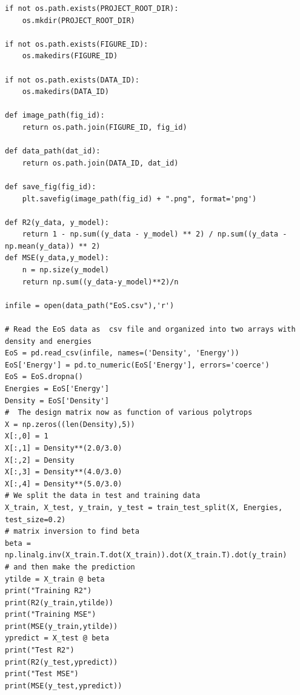 \documentclass{beamer}
\begin{document}
\begin{frame}
\begin{verbatim}
if not os.path.exists(PROJECT_ROOT_DIR):
    os.mkdir(PROJECT_ROOT_DIR)

if not os.path.exists(FIGURE_ID):
    os.makedirs(FIGURE_ID)

if not os.path.exists(DATA_ID):
    os.makedirs(DATA_ID)

def image_path(fig_id):
    return os.path.join(FIGURE_ID, fig_id)

def data_path(dat_id):
    return os.path.join(DATA_ID, dat_id)

def save_fig(fig_id):
    plt.savefig(image_path(fig_id) + ".png", format='png')

def R2(y_data, y_model):
    return 1 - np.sum((y_data - y_model) ** 2) / np.sum((y_data - np.mean(y_data)) ** 2)
def MSE(y_data,y_model):
    n = np.size(y_model)
    return np.sum((y_data-y_model)**2)/n

infile = open(data_path("EoS.csv"),'r')

# Read the EoS data as  csv file and organized into two arrays with density and energies
EoS = pd.read_csv(infile, names=('Density', 'Energy'))
EoS['Energy'] = pd.to_numeric(EoS['Energy'], errors='coerce')
EoS = EoS.dropna()
Energies = EoS['Energy']
Density = EoS['Density']
#  The design matrix now as function of various polytrops
X = np.zeros((len(Density),5))
X[:,0] = 1
X[:,1] = Density**(2.0/3.0)
X[:,2] = Density
X[:,3] = Density**(4.0/3.0)
X[:,4] = Density**(5.0/3.0)
# We split the data in test and training data
X_train, X_test, y_train, y_test = train_test_split(X, Energies, test_size=0.2)
# matrix inversion to find beta
beta = np.linalg.inv(X_train.T.dot(X_train)).dot(X_train.T).dot(y_train)
# and then make the prediction
ytilde = X_train @ beta
print("Training R2")
print(R2(y_train,ytilde))
print("Training MSE")
print(MSE(y_train,ytilde))
ypredict = X_test @ beta
print("Test R2")
print(R2(y_test,ypredict))
print("Test MSE")
print(MSE(y_test,ypredict))

\end{verbatim}
\end{frame}
\end{document}
